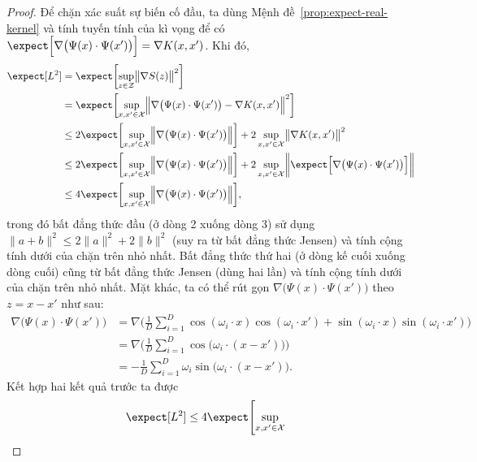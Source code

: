 \begin{proof}
  Để chặn xác suất sự biến cố đầu, ta dùng Mệnh
  đề~\ref{prop:expect-real-kernel} và tính tuyến tính của kì vọng để có
  $\expect\Bigl[ \nabla\bigl( \Psi(x)
  \cdot \Psi(x') \bigr ) \Bigr ] = \nabla K(x, x')$. Khi đó, \begin{align}
    \expect[L^2] &= \expect \biggl[ \sup_{z \in \mathcal{Z}} \bigl\lVert \nabla
    S(z) \bigr\rVert^2 \biggr] \\
    &= \expect \biggl[ \sup_{x, x' \in \mathcal{X}} \Bigl\lVert \nabla\bigl(
    \Psi(x) \cdot \Psi(x') \bigr ) - \nabla K(x, x') \Bigr\rVert^2 \biggr ] \\
    &\le 2\expect \biggl[ \sup_{x, x' \in \mathcal{X}} \Bigl\lVert \nabla
    \bigl( \Psi(x) \cdot \Psi(x') \bigr ) \Bigl\rVert \biggr ] + 2\sup_{x, x'
    \in \mathcal{X}} \bigl\lVert \nabla K(x, x') \bigr\rVert^2 \\
    &\le 2\expect \biggl[ \sup_{x, x' \in \mathcal{X}} \Bigl\lVert \nabla
    \bigl( \Psi(x) \cdot \Psi(x') \bigr ) \Bigl\rVert \biggr ] + 2\sup_{x, x'
    \in \mathcal{X}} \biggl\lVert \expect\Bigl[ \nabla\bigl( \Psi(x) \cdot
    \Psi(x') \bigr ) \Bigr ] \biggr\rVert \\
    &\le 4\expect \biggl[ \sup_{x, x' \in \mathcal{X}} \Bigl\lVert \nabla
    \bigl( \Psi(x) \cdot \Psi(x') \bigr ) \Bigl\rVert \biggr ],
  \end{align} trong đó bất đẳng thức đầu (ở dòng 2 xuống dòng 3) sử dụng
  $\lVert a + b \rVert^2 \le 2\lVert a\rVert^2 + 2 \lVert b \rVert^2$ (suy ra
  từ bất đẳng thức Jensen) và tính cộng tính dưới của chặn trên nhỏ nhất. Bất
  đẳng thức thứ hai (ở dòng kế cuối xuống dòng cuối) cũng từ bất đẳng thức
  Jensen (dùng hai lần) và tính cộng tính dưới của chặn trên nhỏ nhất. Mặt
  khác, ta có thể rút gọn $\nabla\bigl( \Psi(x) \cdot \Psi(x') \bigr )$ theo $z
  = x - x'$ như sau: \begin{align}
    \nabla\bigl( \Psi(x) \cdot \Psi(x') \bigr ) &= \nabla \biggl( \frac{1}{D}
    \sum_{i=1}^D \cos(\omega_i \cdot x) \cos(\omega_i \cdot x') + \sin(\omega_i
    \cdot x) \sin(\omega_i \cdot x') \biggr ) \\
    &= \nabla \biggl( \frac{1}{D} \sum_{i = 1}^D \cos\bigl( \omega_i \cdot (x -
    x') \bigr ) \biggr ) \\
    &= -\frac{1}{D} \sum_{i = 1}^D \omega_i \sin\bigl( \omega_i \cdot (x - x')
    \bigr).
  \end{align} Kết hợp hai kết quả trước ta được \begin{align}
    \expect[L^2] &\le 4\expect \Biggl[ \sup_{x, x' \in \mathcal{X}}

\end{align}
\end{proof}
